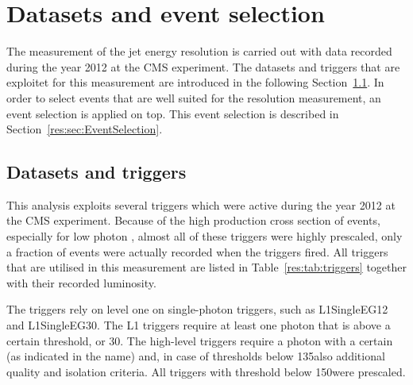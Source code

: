 \chapter{Datasets and event selection}

The measurement of the jet energy resolution is carried out with \GAMJET data recorded during the year 2012 at the CMS experiment.
The datasets and triggers that are exploitet for this measurement are introduced in the following Section~\ref{res:sec:DatasetsAndTriggers}.
In order to select \GAMJET events that are well suited for the resolution measurement, an event selection is applied on top. %
This event selection is described in Section~\ref{res:sec:EventSelection}.

\section{Datasets and triggers}
\label{res:sec:DatasetsAndTriggers}
This analysis exploits several triggers which were active during the year 2012 at the CMS experiment.
Because of the high production cross section of \GAMJET events, especially for low photon \pt, almost all of these triggers were highly prescaled, \ie only a fraction of events were actually recorded when the triggers fired.
All triggers that are utilised in this measurement are listed in Table~\ref{res:tab:triggers} together with their recorded luminosity.
\renewcommand{\arraystretch}{1.5}
\begin{table}[!hbt]
\centering
\caption{Single-photon triggers together with the recorded luminosity taking the prescales of the triggers into consideration.}
\label{res:tab:triggers}
\end{table}  
The triggers rely on level one on single-photon triggers, such as L1SingleEG12 and L1SingleEG30.
The L1 triggers require at least one photon that is above a certain \pt threshold, \gev or 30\gev.
The high-level triggers require a photon with a certain \pt (as indicated in the name) and, in case of thresholds below 135\gev also additional quality and isolation criteria. 
All triggers with threshold below 150\gev were prescaled.

